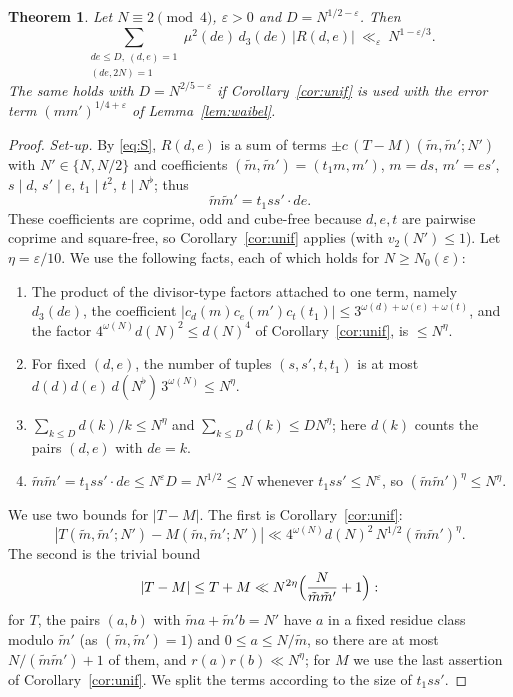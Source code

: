 \documentclass[11pt]{amsart}
\newtheorem{theorem}{Theorem}[section]
\theoremstyle{remark}
\newcommand{\e}{\varepsilon}
\begin{document}
\begin{theorem}\label{thm:level}
Let $N\equiv2\pmod4$, $\e>0$ and $D=N^{1/2-\e}$. Then
\[
\sum_{\substack{de\le D,\ (d,e)=1\\ (de,2N)=1}}\mu^2(de)\,d_3(de)\,|R(d,e)|\ \ll_\e\ N^{1-\e/3}.
\]
The same holds with $D=N^{2/5-\e}$ if Corollary~\ref{cor:unif} is used with the error term $(mm')^{1/4+\e}$ of Lemma~\ref{lem:waibel}.
\end{theorem}
\begin{proof}
\emph{Set-up.} By \eqref{eq:S}, $R(d,e)$ is a sum of terms $\pm c\,(T-M)(\tilde m,\tilde m';N')$ with $N'\in\{N,N/2\}$ and coefficients $(\tilde m,\tilde m')=(t_1m,m')$, $m=ds$, $m'=es'$, $s\mid d$, $s'\mid e$, $t_1\mid t^2$, $t\mid N^\flat$; thus
\[
\tilde m\tilde m'=t_1ss'\cdot de .
\]
These coefficients are coprime, odd and cube-free because $d,e,t$ are pairwise coprime and square-free, so Corollary~\ref{cor:unif} applies (with $v_2(N')\le1$). Let $\eta=\e/10$. We use the following facts, each of which holds for $N\ge N_0(\e)$:
\begin{enumerate}[label=(F\arabic*),leftmargin=3em]
\item The product of the divisor-type factors attached to one term, namely $d_3(de)$, the coefficient $|c_d(m)c_e(m')c_t(t_1)|\le3^{\omega(d)+\omega(e)+\omega(t)}$, and the factor $4^{\omega(N)}d(N)^2\le d(N)^4$ of Corollary~\ref{cor:unif}, is $\le N^{\eta}$.
\item For fixed $(d,e)$, the number of tuples $(s,s',t,t_1)$ is at most $d(d)d(e)\,d(N^\flat)\,3^{\omega(N)}\le N^{\eta}$.
\item $\sum_{k\le D}d(k)/k\le N^\eta$ and $\sum_{k\le D}d(k)\le DN^{\eta}$; here $d(k)$ counts the pairs $(d,e)$ with $de=k$.
\item $\tilde m\tilde m'=t_1ss'\cdot de\le N^\e D=N^{1/2}\le N$ whenever $t_1ss'\le N^\e$, so $(\tilde m\tilde m')^{\eta}\le N^\eta$.
\end{enumerate}
We use two bounds for $|T-M|$. The first is Corollary~\ref{cor:unif}:
\begin{equation}\label{eq:bd1}
|T(\tilde m,\tilde m';N')-M(\tilde m,\tilde m';N')|\ll 4^{\omega(N)}d(N)^2\,N^{1/2}(\tilde m\tilde m')^{\eta}.
\end{equation}
The second is the trivial bound
\begin{equation}\label{eq:bd2}
|T-M|\le T+M\ll N^{2\eta}\Bigl(\frac{N}{\tilde m\tilde m'}+1\Bigr):
\end{equation}
for $T$, the pairs $(a,b)$ with $\tilde ma+\tilde m'b=N'$ have $a$ in a fixed residue class modulo $\tilde m'$ (as $(\tilde m,\tilde m')=1$) and $0\le a\le N/\tilde m$, so there are at most $N/(\tilde m\tilde m')+1$ of them, and $r(a)r(b)\ll N^{\eta}$; for $M$ we use the last assertion of Corollary~\ref{cor:unif}. We split the terms according to the size of $t_1ss'$.


\end{proof}
\end{document}
